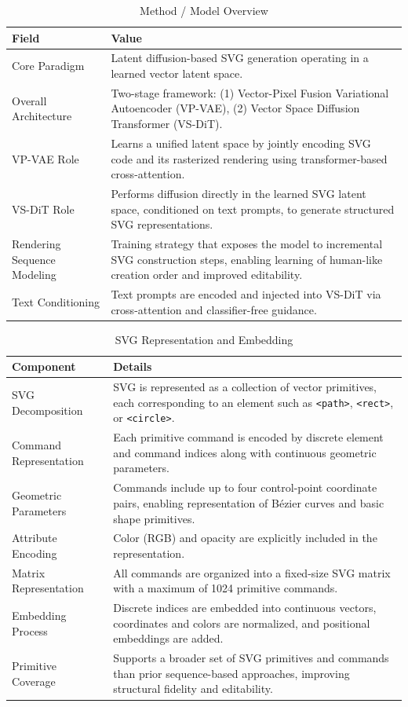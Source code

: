 \begin{table}[h!]
\centering
\caption{Method / Model Overview}
\begin{tabular}{|l|p{10cm}|}
\hline
\textbf{Field} & \textbf{Value} \\ \hline
Core Paradigm &
Latent diffusion-based SVG generation operating in a learned vector latent space. \\ \hline
Overall Architecture &
Two-stage framework: (1) Vector-Pixel Fusion Variational Autoencoder (VP-VAE), (2) Vector Space Diffusion Transformer (VS-DiT). \\ \hline
VP-VAE Role &
Learns a unified latent space by jointly encoding SVG code and its rasterized rendering using transformer-based cross-attention. \\ \hline
VS-DiT Role &
Performs diffusion directly in the learned SVG latent space, conditioned on text prompts, to generate structured SVG representations. \\ \hline
Rendering Sequence Modeling &
Training strategy that exposes the model to incremental SVG construction steps, enabling learning of human-like creation order and improved editability. \\ \hline
Text Conditioning &
Text prompts are encoded and injected into VS-DiT via cross-attention and classifier-free guidance. \\ \hline
\end{tabular}
\end{table}

\begin{table}[h!]
\centering
\caption{SVG Representation and Embedding}
\begin{tabular}{|l|p{10cm}|}
\hline
\textbf{Component} & \textbf{Details} \\ \hline
SVG Decomposition &
SVG is represented as a collection of vector primitives, each corresponding to an element such as \texttt{<path>}, \texttt{<rect>}, or \texttt{<circle>}. \\ \hline
Command Representation &
Each primitive command is encoded by discrete element and command indices along with continuous geometric parameters. \\ \hline
Geometric Parameters &
Commands include up to four control-point coordinate pairs, enabling representation of Bézier curves and basic shape primitives. \\ \hline
Attribute Encoding &
Color (RGB) and opacity are explicitly included in the representation. \\ \hline
Matrix Representation &
All commands are organized into a fixed-size SVG matrix with a maximum of 1024 primitive commands. \\ \hline
Embedding Process &
Discrete indices are embedded into continuous vectors, coordinates and colors are normalized, and positional embeddings are added. \\ \hline
Primitive Coverage &
Supports a broader set of SVG primitives and commands than prior sequence-based approaches, improving structural fidelity and editability. \\ \hline
\end{tabular}
\end{table}

